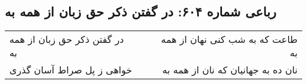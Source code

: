 \begin{center}
\section*{رباعی شماره ۶۰۴: در گفتن ذکر حق زبان از همه به}
\label{sec:sh604}
\begin{longtable}{l p{0.5cm} r}
در گفتن ذکر حق زبان از همه به
&&
طاعت که به شب کنی نهان از همه به
\\
خواهی ز پل صراط آسان گذری
&&
نان ده به جهانیان که نان از همه به
\\
\end{longtable}
\end{center}

